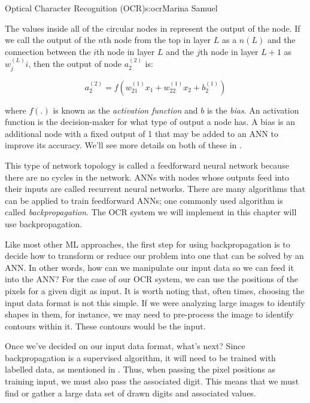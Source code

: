 \begin{aosachapter}{Optical Character Recognition (OCR)}{s:ocr}{Marina Samuel}

The values inside all of the circular nodes in 
represent the output of the node. If we call the output of the $n$th
node from the top in layer $L$ as a $n(L)$ and the connection between
the $i$th node in layer $L$ and the $j$th node in layer $L+1$ as
$w^{(L)}_ji$, then the output of node $a^{(2)}_2$ is:

\[
a^{(2)}_2 = f(w^{(1)}_{21}x_1 + w^{(1)}_{22}x_2 + b^{(1)}_{2})
\]

where $f(.)$ is known as the \emph{activation function} and $b$ is the
\emph{bias}. An activation function is the decision-maker for what type
of output a node has. A bias is an additional node with a fixed output
of 1 that may be added to an ANN to improve its accuracy. We'll see more
details on both of these in .

This type of network topology is called a feedforward neural network
because there are no cycles in the network. ANNs with nodes whose
outputs feed into their inputs are called recurrent neural networks.
There are many algorithms that can be applied to train feedforward ANNs;
one commonly used algorithm is called \emph{backpropagation}. The OCR
system we will implement in this chapter will use backpropagation.

\label{how-do-we-use-anns}

Like most other ML approaches, the first step for using backpropagation
is to decide how to transform or reduce our problem into one that can be
solved by an ANN. In other words, how can we manipulate our input data
so we can feed it into the ANN? For the case of our OCR system, we can
use the positions of the pixels for a given digit as input. It is worth
noting that, often times, choosing the input data format is not this
simple. If we were analyzing large images to identify shapes in them,
for instance, we may need to pre-process the image to identify contours
within it. These contours would be the input.

Once we've decided on our input data format, what's next? Since
backpropagation is a supervised algorithm, it will need to be trained
with labelled data, as mentioned in . Thus, when
passing the pixel positions as training input, we must also pass the
associated digit. This means that we must find or gather a large data
set of drawn digits and associated values.


\end{aosachapter}
